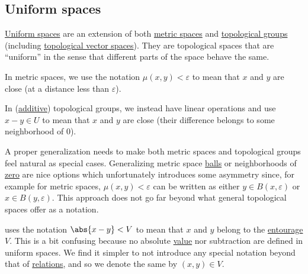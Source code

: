 \subsection{Uniform spaces}\label{subsec:uniform_spaces}

\begin{remark}\label{rem:entourage_notation}
  \hyperref[def:uniform_space]{Uniform spaces} are an extension of both \hyperref[def:metric_space]{metric spaces} and \hyperref[def:topological_group]{topological groups} (including \hyperref[def:topological_vector_space]{topological vector spaces}). They are topological spaces that are \enquote{uniform} in the sense that different parts of the space behave the same.

  In metric spaces, we use the notation \( \mu(x, y) < \varepsilon \) to mean that \( x \) and \( y \) are close (at a distance less than \( \varepsilon \)).

  In (\hyperref[rem:additive_magma]{additive}) topological groups, we instead have linear operations and use \( x - y \in U \) to mean that \( x \) and \( y \) are close (their difference belongs to some neighborhood of \( 0 \)).

  A proper generalization needs to make both metric spaces and topological groups feel natural as special cases. Generalizing metric space \hyperref[def:metric_space/ball]{balls} or neighborhoods of \hyperref[thm:origin_neighborhoods_in_topological_groups]{zero} are nice options which unfortunately introduces some asymmetry since, for example for metric spaces, \( \mu(x, y) < \varepsilon \) can be written as either \( y \in B(x, \varepsilon) \) or \( x \in B(y, \varepsilon) \). This approach does not go far beyond what general topological spaces offer as a notation.

  \cite[section 8]{Engelking1989} uses the notation \( \abs{x - y} < V \) to mean that \( x \) and \( y \) belong to the \hyperref[def:entourage]{entourage} \( V \). This is a bit confusing because no absolute \hyperref[def:absolute_value]{value} nor subtraction are defined in uniform spaces. We find it simpler to not introduce any special notation beyond that of \hyperref[def:relation]{relations}, and so we denote the same by \( (x, y) \in V \).
\end{remark}

